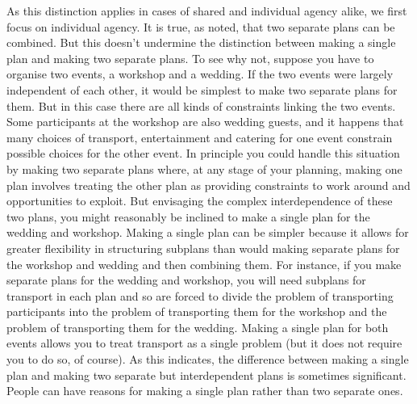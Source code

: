\documentclass[12pt,\papersize]{extarticle}
\begin{document}
As this distinction applies in cases of  shared and individual agency alike, we first focus on individual agency.
It is true, as noted, that  two separate {plans} can be combined.
But this doesn't undermine the distinction between {making} a single plan and {making} two separate plans.
To see why not, 
suppose you have to organise two events, a workshop and a wedding.
If the two events were largely independent of each other,
it would be simplest to make two separate plans for them.
But in this case there are all kinds of constraints linking the two events.
Some participants at the workshop are also wedding guests,
and it happens that many choices of transport, entertainment and catering for one event constrain possible choices for the other event.
In principle you could handle this situation by making two separate plans where, at any stage of your planning, making one plan involves treating the other plan as providing constraints to work around and opportunities to exploit.
But envisaging the complex interdependence of these two plans,
you might reasonably be inclined to make a single plan for the wedding and workshop.
Making a single plan can be simpler because it allows for greater flexibility in structuring subplans than would making separate plans for the workshop and wedding and then combining them.
For instance, if you make separate plans for the wedding and workshop, you will need subplans for transport in each plan and so are forced to divide the problem of transporting participants into the problem of transporting them for the workshop and the problem of transporting them for the wedding.
Making a single plan for both events allows you to treat transport as a single problem (but it does not require you to do so, of course).
As this indicates, the difference between making a single plan and making two separate but interdependent plans is sometimes significant.
People can have reasons for making a single plan rather than two separate ones.
\end{document}
